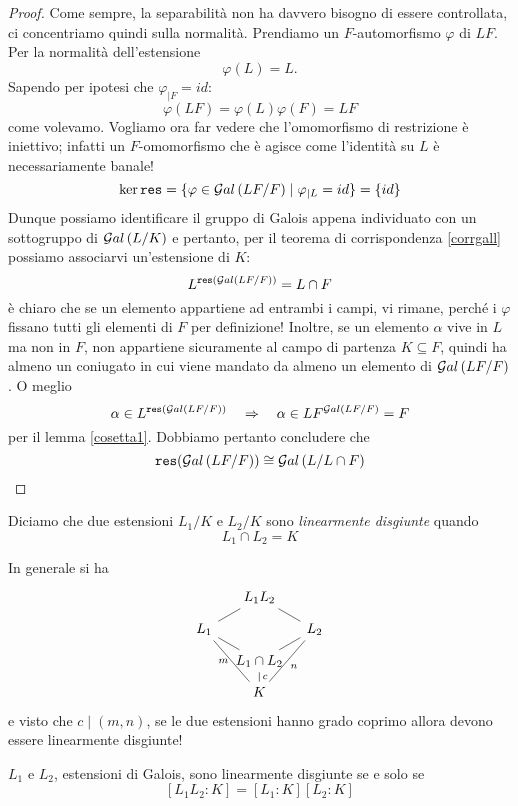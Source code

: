 \begin{multicols}{2}
	\begin{proof}
		Come sempre, la separabilità non ha davvero bisogno di essere controllata, ci concentriamo quindi sulla normalità. Prendiamo un $ F $-automorfismo $ \varphi $ di $ LF $. Per la normalità dell'estensione $$  \varphi(L) = L.  $$ Sapendo per ipotesi che $ \varphi_{|F} = id $: 
		\[ \varphi(LF) = \varphi(L)\varphi(F) = LF \]
		come volevamo. Vogliamo ora far vedere che l'omomorfismo di restrizione
		è iniettivo; infatti un $ F $-omomorfismo che è agisce come l'identità su $ L $ è necessariamente banale!
		\[ \ker \texttt{res} = \{ \varphi \in \mathcal{G}al\left( LF/F \right) \mid \varphi_{|L} = id \} = \{ id \} \]
		Dunque possiamo identificare il gruppo di Galois appena individuato con un sottogruppo di $ \mathcal{G}al\left( L/K \right) $ e pertanto, per il teorema di corrispondenza \ref{corrgall} possiamo associarvi un'estensione di $ K $:
		\[ L^{\texttt{res}(\mathcal{G}al\left( LF/F \right))} = L \cap F \]
		è chiaro che se un elemento appartiene ad entrambi i campi, vi rimane, perché i $ \varphi $ fissano tutti gli elementi di $ F $ per definizione! Inoltre, se un elemento $ \alpha $ vive in $ L $ ma non in $ F $, non appartiene sicuramente al campo di partenza $ K \subseteq F $, quindi ha almeno un coniugato in cui viene mandato da almeno un elemento di $ \mathcal{G}al\left( LF/F \right) $. O meglio
		\[ \alpha \in L^{\texttt{res}(\mathcal{G}al\left( LF/F \right))} \quad\Rightarrow\quad \alpha \in LF^{\mathcal{G}al\left( LF/F \right)} = F \]
		per il lemma \ref{cosetta1}. Dobbiamo pertanto concludere che
		\[ \texttt{res}(\mathcal{G}al\left( LF/F \right)) \cong \mathcal{G}al\left( L/L\cap F \right) \]
	\end{proof}
	\columnbreak
	\begin{definition}
		Diciamo che due estensioni $ L_1/K $ e $ L_2/K $ sono \emph{linearmente disgiunte} quando
		\[ L_1 \cap L_2 = K \]
	\end{definition}

	\begin{remark}
		In generale si ha
		\[\begin{tikzcd}[row sep=0.25cm, column sep=0.3cm]
		& L_1L_2 \arrow[dl,-] \arrow[dr,-] &  \\
		L_1 \arrow[ddr,-, "m" left] \arrow[dr,-] &  & L_2 \arrow [ddl,-, "n"] \\
		& L_1\cap L_2 \arrow[ur,-] \arrow[d,-, "c"]  & \\
		& K &
		\end{tikzcd} \]
		e visto che $ c \mid (m, n) $, se le due estensioni hanno grado coprimo allora devono essere linearmente disgiunte!
	\end{remark}
	\begin{remark}
		$ L_1 $ e $ L_2 $, estensioni di Galois, sono linearmente disgiunte se e solo se \[ [L_1L_2: K] = [L_1: K][L_2: K] \]
	\end{remark}
	

\end{multicols}
